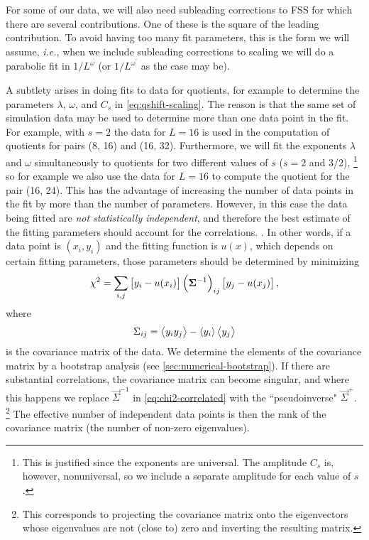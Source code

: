For some of our data, we will also need subleading corrections to FSS for which
there are several contributions. One of these is the square of the leading
contribution. To avoid having too many fit parameters, this is the form we will
assume, \emph{i.e.}, when we include subleading corrections to scaling we will
do a parabolic fit in $1/L^{\omega}$ (or $1/L^{\omega^{\prime}}$ as the case
may be).

A subtlety arises in doing fits to data for quotients, for example to determine
the parameters $\lambda$, $\omega$, and $C_s$ in \cref{eq:qshift-scaling}. The
reason is that the same set of simulation data may be used to determine more
than one data point in the fit. For example, with $s=2$ the data for $L=16$ is
used in the computation of quotients for pairs (8, 16) and (16, 32).
Furthermore, we will fit the exponents $\lambda$ and $\omega$ simultaneously to
quotients for two different values of $s$ ($s=2$ and 3/2),%
\footnote{%
  This is justified since the exponents are universal. The amplitude $C_s$ is,
  however, nonuniversal, so we include a separate amplitude for each value of
  $s$.
}
so for example we also use the data for $L=16$ to compute the quotient for the
pair (16, 24). This has the advantage of increasing the number of data points
in the fit by more than the number of parameters. However, in this case the
data being fitted are \emph{not statistically independent}, and therefore the
best estimate of the fitting parameters should account for the correlations.
\autocite{ballesteros1996finite,ballesteros1998critical,weigel2009cross}. In
other words, if a data point is $(x_i,y_i)$ and the fitting function is $u(x)$,
which depends on certain fitting parameters, those parameters should be
determined by minimizing
\begin{equation}
  \chi^2 = \sum_{i,j}
  \left[y_i - u(x_i)\right]
  \left(\bm{\Sigma}^{-1}\right)_{ij}
  \left[y_j - u(x_j)\right],
  \label{eq:chi2-correlated}
\end{equation}
where
\begin{equation}
  \Sigma_{ij} = \left< y_i y_j \right> - \left< y_i \right>\left< y_j \right>
\end{equation}
is the covariance matrix of the data. We determine the elements of the
covariance matrix by a bootstrap analysis (see
\cref{sec:numerical-bootstrap}). If there are substantial correlations, the
covariance matrix can become singular, and where this happens we replace
$\vec{\Sigma}^{-1}$ in \cref{eq:chi2-correlated} with the ``pseudoinverse"
$\vec{\Sigma}^+$.%
\footnote{%
  This corresponds to projecting the covariance matrix onto the eigenvectors
  whose eigenvalues are not (close to) zero and inverting the resulting matrix.
}
The effective number of independent data points is then the rank of the
covariance matrix (the number of non-zero eigenvalues).


